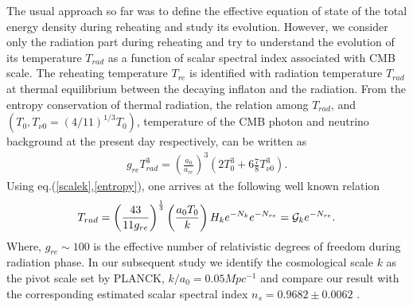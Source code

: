 \documentclass[prl,twocolumn,superscriptaddress,doublespace]{revtex4}%
\def\bea{\begin{eqnarray}}
\def\eea{\end{eqnarray}}
\begin{document}
The usual approach so far was to define the effective equation of state of the total energy density during reheating and study its evolution. However, we consider only the radiation part during reheating and try to understand the evolution of its temperature $T_{rad}$ as a function of scalar spectral index associated with  CMB scale.  
The reheating temperature $T_{re}$ is identified with radiation temperature $T_{rad}$
at thermal equilibrium between the decaying inflaton and the radiation. From the entropy conservation of thermal radiation, the relation among $T_{rad}$, and $(T_0, T_{\nu 0} = (4/11)^{1/3} T_0)$, temperature of the CMB photon and neutrino background at the present day respectively, can be written as 
\bea \label{entropy}
g_{re} T_{rad}^3 = \left(\frac {a_0}{a_{re}}\right)^3\left( 2 T_0^3 + 6 \frac 7 8 T_{\nu 0}^3\right).
\eea
Using eq.(\ref{scalek},\ref{entropy}), one arrives at the following well known relation
\bea \label{eqtre}
T_{rad}= \left(\frac{43}{11 g_{re}}\right)^{\frac 1 3}\left(\frac{a_0T_0}{k}\right) H_k e^{-N_k} e^{-N_{re}} ={\cal G}_k e^{-N_{re}} .
\eea
Where, $g_{re} \sim 100$ is the effective number of relativistic degrees of freedom during radiation phase. In our subsequent study we identify the cosmological scale $k$ as the pivot scale set by PLANCK, $k/a_0 = 0.05 Mpc^{-1}$ and compare our result with the corresponding estimated scalar spectral index $n_s = 0.9682 \pm 0.0062$ 
\cite{PLANCK}.
\end{document}
